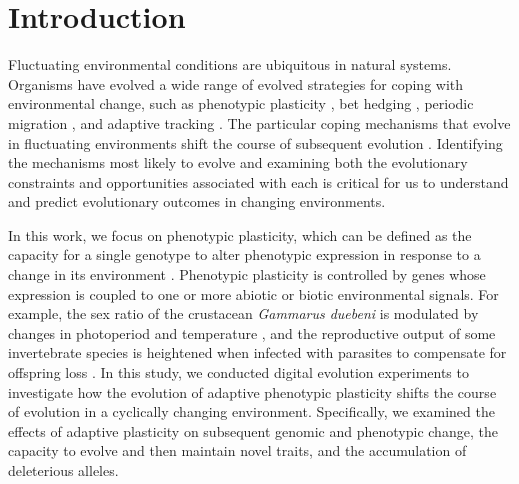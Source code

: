 
\section{Introduction}

Fluctuating environmental conditions are ubiquitous in natural systems. 
Organisms have evolved a wide range of evolved strategies for coping with environmental change, such as 
phenotypic plasticity \citep{ghalambor_adaptive_2007}, 
bet hedging \citep{beaumont_experimental_2009}, 
periodic migration \citep{winger_long_2019}, 
and adaptive tracking \citep{barrett_adaptation_2008}.
The particular coping mechanisms that evolve in fluctuating environments shift the course of subsequent evolution \citep{wennersten_population-level_2012,schaum_plasticity_2014}.
Identifying the mechanisms most likely to evolve and examining both the evolutionary constraints and opportunities associated with each is critical for us to understand and predict evolutionary outcomes in changing environments.

In this work, we focus on phenotypic plasticity, which can be defined as the capacity for a single genotype to alter phenotypic expression in response to a change in its environment \citep{west-eberhard_developmental_2003}. 
Phenotypic plasticity is controlled by genes whose expression is coupled to one or more abiotic or biotic environmental signals. 
For example, the sex ratio of the crustacean \textit{Gammarus duebeni} is modulated by changes in photoperiod and temperature \citep{dunn_two_2005}, and the reproductive output of some invertebrate species is heightened when infected with parasites to compensate for offspring loss \citep{chadwick_parasite-mediated_2005}. 
In this study, we conducted digital evolution experiments to investigate how the evolution of adaptive phenotypic plasticity shifts the course of evolution in a cyclically changing environment.
Specifically, we examined the effects of adaptive plasticity on subsequent genomic and phenotypic change, the capacity to evolve and then maintain novel traits, and the accumulation of deleterious alleles.


